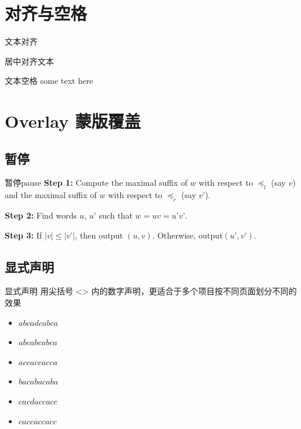 \documentclass[UTF8,14pt,aspectratio=43,dvipsnames,svgnames,x11names,hyperref={urlcolor=blue}]{beamer}
\begin{document}
\section[对齐与空格]{对齐与空格}
\begin{frame}{文本对齐}
	\begin{center}  %
		居中对齐文本
	\end{center}
\end{frame}

\begin{frame}{文本空格}
	some \hskip20pt text here  %
\end{frame}

\section[Overlay 蒙板覆盖]{Overlay 蒙版覆盖}
\subsection[暂停]{暂停}
\begin{frame}{暂停}{pause}
	\textbf{Step 1:} Compute the maximal suffix of $w$
	with respect to $\preceq_l$ (say $v$) and the
	maximal suffix of $w$ with respect to $\preceq_r$
	(say $v’$).\\
	
	\pause
	
	\textbf{Step 2:} Find words $u$, $u’$ such that
	$w = uv = u’v’$.\\
	
	\pause
	
	\textbf{Step 3:} If $|v| \le |v’|$, then output
	$(u,v)$. Otherwise, output$(u’,v’)$.
\end{frame}

\subsection[显式声明]{显式声明}
\begin{frame}{显式声明}
	用尖括号 <> 内的数字声明，更适合于多个项目按不同页面划分不同的效果
	\begin{itemize}[<+->]  %
		\item<1> $abcadcabca$\\
		\item<1-2> $abcabcabca$\\
		\item<1-2> $accaccacca$\\
		\item<1> $bacabacaba$\\
		\item<1,3> $cacdaccacc$\\
		\item<1-2> $caccaccacc$
	\end{itemize}
\end{frame}
\end{document}
